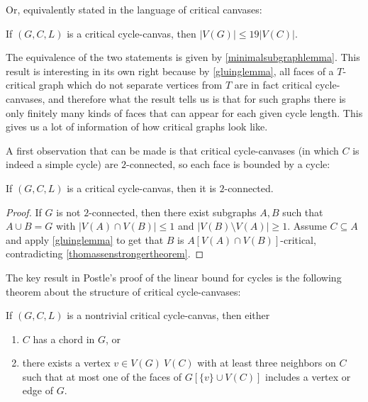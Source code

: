 Or, equivalently stated in the language of critical canvases:

\begin{theorem}
If $(G, C, L)$ is a critical cycle-canvas, then $|V(G)| \leq 19 |V(C)|$.
\end{theorem}

The equivalence of the two statements is given by \ref{minimalsubgraphlemma}. This result is interesting in its own right because by \ref{gluinglemma}, all faces of a $T$-critical graph which do not separate vertices from $T$ are in fact critical cycle-canvases, and therefore what the result tells us is that for such graphs there is only finitely many kinds of faces that can appear for each given cycle length. This gives us a lot of information of how critical graphs look like. 

A first observation that can be made is that critical cycle-canvases (in which $C$ is indeed a simple cycle) are $2$-connected, so each face is bounded by a cycle:

\begin{lemma}
If $(G, C, L)$ is a critical cycle-canvas, then it is $2$-connected.
\end{lemma}

\begin{proof}
If $G$ is not $2$-connected, then there exist subgraphs $A, B$ such that $A \cup B = G$ with $|V(A) \cap V(B)| \leq 1$ and $|V(B) \setminus V(A)| \geq 1$. Assume $C \subseteq A$ and apply \ref{gluinglemma} to get that $B$ is $A[V(A) \cap V(B)]$-critical, contradicting \ref{thomassenstrongertheorem}.
\end{proof}

The key result in Postle's proof of the linear bound for cycles is the following theorem about the structure of critical cycle-canvases:

\begin{theorem}
\label{cyclechordtripodtheorem}
If $(G, C, L)$ is a nontrivial critical cycle-canvas, then either

\begin{enumerate}
\item $C$ has a chord in $G$, or
\item there exists a vertex $v \in V(G) \ V(C)$ with at least three neighbors on $C$ such that at most one of the faces of $G[\{v\} \cup V(C)]$ includes a vertex or edge of $G$. 
\end{enumerate}
\end{theorem}


